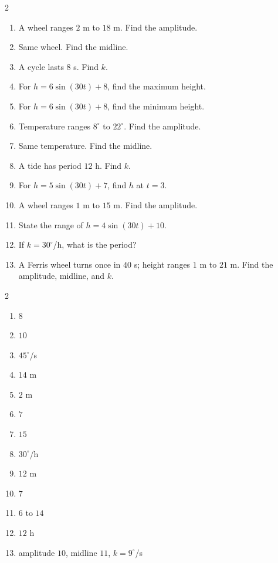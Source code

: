 \documentclass[11pt]{article}
\begin{document}
\begin{recapbox}
\begin{multicols}{2}
\small
\begin{enumerate}[leftmargin=*,itemsep=3pt]
  \item A wheel ranges $2$ m to $18$ m. Find the amplitude.
  \item Same wheel. Find the midline.
  \item A cycle lasts $8$ s. Find $k$.
  \item For $h=6\sin(30t)+8$, find the maximum height.
  \item For $h=6\sin(30t)+8$, find the minimum height.
  \item Temperature ranges $8^\circ$ to $22^\circ$. Find the amplitude.
  \item Same temperature. Find the midline.
  \item A tide has period $12$ h. Find $k$.
  \item For $h=5\sin(30t)+7$, find $h$ at $t=3$.
  \item A wheel ranges $1$ m to $15$ m. Find the amplitude.
  \item State the range of $h=4\sin(30t)+10$.
  \item If $k=30^\circ$/h, what is the period?
  \item A Ferris wheel turns once in $40$ s; height ranges $1$ m to $21$ m. Find the amplitude, midline, and $k$.
\end{enumerate}
\end{multicols}
\end{recapbox}

\begin{keybox}
\begin{multicols}{2}
\small
\begin{enumerate}[leftmargin=*,itemsep=3pt]
  \item $8$
  \item $10$
  \item $45^\circ$/s
  \item $14$ m
  \item $2$ m
  \item $7$
  \item $15$
  \item $30^\circ$/h
  \item $12$ m
  \item $7$
  \item $6$ to $14$
  \item $12$ h
  \item amplitude $10$, midline $11$, $k=9^\circ$/s
\end{enumerate}
\end{multicols}
\end{keybox}
\end{document}

